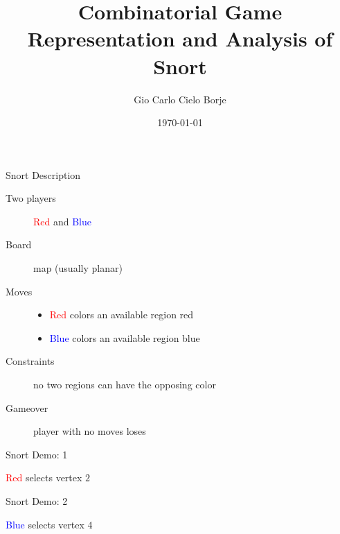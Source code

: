 \documentclass[mathserif]{beamer}
\author{Gio Carlo Cielo Borje}
\institute{UC Irvine}
\title{Combinatorial Game Representation and Analysis of Snort}
\date{\today}
\newcommand{\rplayer}{\textcolor{red}{Red }}
\newcommand{\bplayer}{\textcolor{blue}{Blue }}
\begin{document}
\begin{frame}
	\maketitle
\end{frame}

\begin{frame}{Snort Description}
	\begin{description}
		\item [Two players] \rplayer and \bplayer
		\item [Board] map (usually planar)
		\item [Moves]
			\begin{itemize}
				\item \rplayer colors an available region red
				\item \bplayer colors an available region blue
			\end{itemize}
		\item [Constraints] no two regions can have the opposing color
		\item [Gameover] player with no moves loses
	\end{description}

	\vfill
	\pause
	\begin{figure}[h]
		\centering
		\begin{tikzpicture}
			
		\end{tikzpicture}
	\end{figure}
\end{frame}

\begin{frame}{Snort Demo: 1}
	\begin{figure}[h]
		\centering
		\begin{tikzpicture}
			
		\end{tikzpicture}
	\end{figure}
	\vfill
	\begin{center}
		\rplayer selects vertex $2$
	\end{center}
\end{frame}

\begin{frame}{Snort Demo: 2}
	\begin{figure}[h]
		\centering
		\begin{tikzpicture}
			
		\end{tikzpicture}
	\end{figure}
	\vfill
	\begin{center}
		\bplayer selects vertex $4$
	\end{center}
\end{frame}
\end{document}

